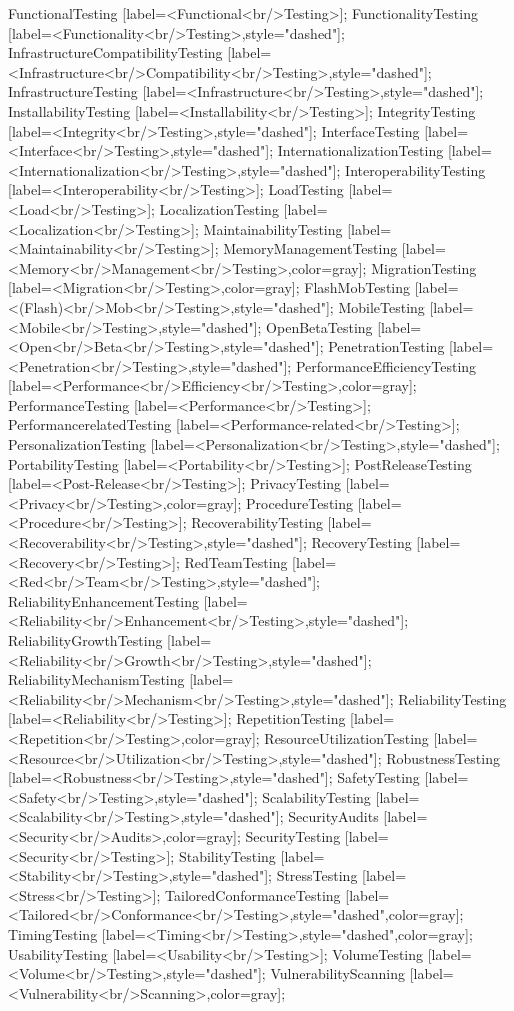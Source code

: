 \documentclass{article}
\begin{document}
{FunctionalTesting [label=<Functional<br/>Testing>];
FunctionalityTesting [label=<Functionality<br/>Testing>,style="dashed"];
InfrastructureCompatibilityTesting [label=<Infrastructure<br/>Compatibility<br/>Testing>,style="dashed"];
InfrastructureTesting [label=<Infrastructure<br/>Testing>,style="dashed"];
InstallabilityTesting [label=<Installability<br/>Testing>];
IntegrityTesting [label=<Integrity<br/>Testing>,style="dashed"];
InterfaceTesting [label=<Interface<br/>Testing>,style="dashed"];
InternationalizationTesting [label=<Internationalization<br/>Testing>,style="dashed"];
InteroperabilityTesting [label=<Interoperability<br/>Testing>];
LoadTesting [label=<Load<br/>Testing>];
LocalizationTesting [label=<Localization<br/>Testing>];
MaintainabilityTesting [label=<Maintainability<br/>Testing>];
MemoryManagementTesting [label=<Memory<br/>Management<br/>Testing>,color=gray];
MigrationTesting [label=<Migration<br/>Testing>,color=gray];
FlashMobTesting [label=<(Flash)<br/>Mob<br/>Testing>,style="dashed"];
MobileTesting [label=<Mobile<br/>Testing>,style="dashed"];
OpenBetaTesting [label=<Open<br/>Beta<br/>Testing>,style="dashed"];
PenetrationTesting [label=<Penetration<br/>Testing>,style="dashed"];
PerformanceEfficiencyTesting [label=<Performance<br/>Efficiency<br/>Testing>,color=gray];
PerformanceTesting [label=<Performance<br/>Testing>];
PerformancerelatedTesting [label=<Performance-related<br/>Testing>];
PersonalizationTesting [label=<Personalization<br/>Testing>,style="dashed"];
PortabilityTesting [label=<Portability<br/>Testing>];
PostReleaseTesting [label=<Post-Release<br/>Testing>];
PrivacyTesting [label=<Privacy<br/>Testing>,color=gray];
ProcedureTesting [label=<Procedure<br/>Testing>];
RecoverabilityTesting [label=<Recoverability<br/>Testing>,style="dashed"];
RecoveryTesting [label=<Recovery<br/>Testing>];
RedTeamTesting [label=<Red<br/>Team<br/>Testing>,style="dashed"];
ReliabilityEnhancementTesting [label=<Reliability<br/>Enhancement<br/>Testing>,style="dashed"];
ReliabilityGrowthTesting [label=<Reliability<br/>Growth<br/>Testing>,style="dashed"];
ReliabilityMechanismTesting [label=<Reliability<br/>Mechanism<br/>Testing>,style="dashed"];
ReliabilityTesting [label=<Reliability<br/>Testing>];
RepetitionTesting [label=<Repetition<br/>Testing>,color=gray];
ResourceUtilizationTesting [label=<Resource<br/>Utilization<br/>Testing>,style="dashed"];
RobustnessTesting [label=<Robustness<br/>Testing>,style="dashed"];
SafetyTesting [label=<Safety<br/>Testing>,style="dashed"];
ScalabilityTesting [label=<Scalability<br/>Testing>,style="dashed"];
SecurityAudits [label=<Security<br/>Audits>,color=gray];
SecurityTesting [label=<Security<br/>Testing>];
StabilityTesting [label=<Stability<br/>Testing>,style="dashed"];
StressTesting [label=<Stress<br/>Testing>];
TailoredConformanceTesting [label=<Tailored<br/>Conformance<br/>Testing>,style="dashed",color=gray];
TimingTesting [label=<Timing<br/>Testing>,style="dashed",color=gray];
UsabilityTesting [label=<Usability<br/>Testing>];
VolumeTesting [label=<Volume<br/>Testing>,style="dashed"];
VulnerabilityScanning [label=<Vulnerability<br/>Scanning>,color=gray];

}
\end{document}
